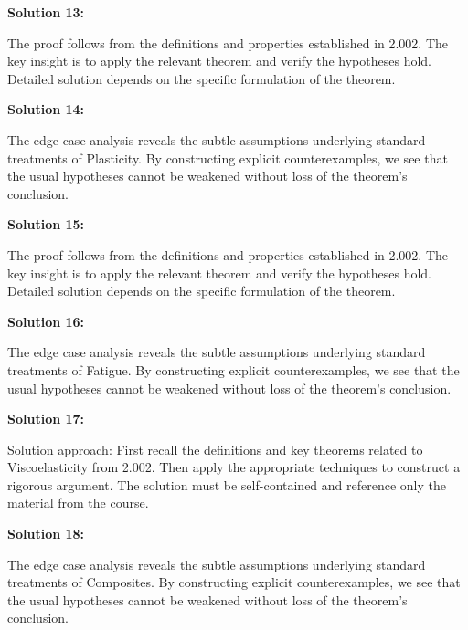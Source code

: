 \documentclass[12pt,a4paper]{exam}
\begin{document}
\vspace{0.5cm}

\textbf{Solution 13:}

The proof follows from the definitions and properties established in 2.002. The key insight is to apply the relevant theorem and verify the hypotheses hold. Detailed solution depends on the specific formulation of the theorem.

\vspace{0.5cm}

\textbf{Solution 14:}

The edge case analysis reveals the subtle assumptions underlying standard treatments of Plasticity. By constructing explicit counterexamples, we see that the usual hypotheses cannot be weakened without loss of the theorem's conclusion.

\vspace{0.5cm}

\textbf{Solution 15:}

The proof follows from the definitions and properties established in 2.002. The key insight is to apply the relevant theorem and verify the hypotheses hold. Detailed solution depends on the specific formulation of the theorem.

\vspace{0.5cm}

\textbf{Solution 16:}

The edge case analysis reveals the subtle assumptions underlying standard treatments of Fatigue. By constructing explicit counterexamples, we see that the usual hypotheses cannot be weakened without loss of the theorem's conclusion.

\vspace{0.5cm}

\textbf{Solution 17:}

Solution approach: First recall the definitions and key theorems related to Viscoelasticity from 2.002. Then apply the appropriate techniques to construct a rigorous argument. The solution must be self-contained and reference only the material from the course.

\vspace{0.5cm}

\textbf{Solution 18:}

The edge case analysis reveals the subtle assumptions underlying standard treatments of Composites. By constructing explicit counterexamples, we see that the usual hypotheses cannot be weakened without loss of the theorem's conclusion.
\end{document}
